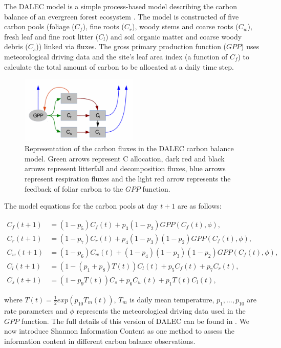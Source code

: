 \documentclass[11pt]{article}
\begin{document}
The DALEC model is a simple process-based model describing the carbon balance of an evergreen forest ecosystem \cite{williams2005improved}. The model is constructed of five carbon pools (foliage ($C_f$), fine roots ($C_r$), woody stems and coarse roots ($C_w$), fresh leaf and fine root litter ($C_l$) and soil organic matter and coarse woody debris ($C_s$)) linked via fluxes. The gross primary production function ($GPP$) uses meteorological driving data and the site's leaf area index (a function of $C_f$) to calculate the total amount of carbon to be allocated at a daily time step.   
\begin{figure}[h!]
    \centering
    \includegraphics[width=0.5\textwidth]{DALECpic.png}
    \caption{Representation of the carbon fluxes in the DALEC carbon balance model. Green arrows represent C allocation, dark red and black arrows represent litterfall and decomposition fluxes, blue arrows represent respiration fluxes and the light red arrow represents the feedback of foliar carbon to the $GPP$ function.  \cite{delahaies2013regularization}}
    \label{fig:DALEC_mod}
\end{figure}

The model equations for the carbon pools at day $t+1$ are as follows:

\begin{align}
C_f(t+1)&=(1-p_5)C_f(t)+p_3(1-p_2)GPP(C_f(t),\phi),
\\C_r(t+1)&=(1-p_7)C_r(t)+p_4(1-p_3)(1-p_2)GPP(C_f(t),\phi), 
\\C_w(t+1)&=(1-p_6)C_w(t)+(1-p_4)(1-p_3)(1-p_2)GPP(C_f(t),\phi), 
\\C_l(t+1)&=(1-(p_1+p_8)T(t))C_l(t)+p_5C_f(t)+p_7C_r(t), 
\\C_s(t+1)&=(1-p_9T(t))C_s+p_6C_w(t)+p_1T(t)C_l(t),
\end{align}

where $T(t)=\frac{1}{2}exp(p_{10}T_m(t))$, $T_m$ is daily mean temperature, $p_1,\ldots,p_{10}$ are rate parameters and $\phi$ represents the meteorological driving data used in the $GPP$ function. The full details of this version of DALEC can be found in \cite{williams2005improved}. We now introduce Shannon Information Content as one method to assess the information content in different carbon balance observations. 
\end{document}
